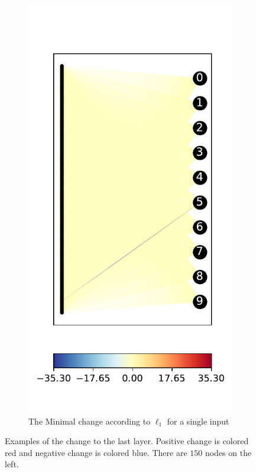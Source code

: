 \documentclass{easychair}
\begin{document}
\begin{figure}
\begin{subfigure}{0.4\linewidth}
  \end{subfigure}
  \begin{subfigure}{0.4\linewidth}
    \includegraphics[width=\linewidth]{../data/results/problem2/last_layer_1_wm_example.pdf}
    \caption{The Minimal change according to $\ell_1$ for a single input}
  \end{subfigure}
  \caption{Examples of the change to the last layer. Positive change is colored red and negative change is colored blue. There are $150$ nodes on the left.}
  \label{fig:lastLayerExampleSingle}
\end{figure}
\end{document}
